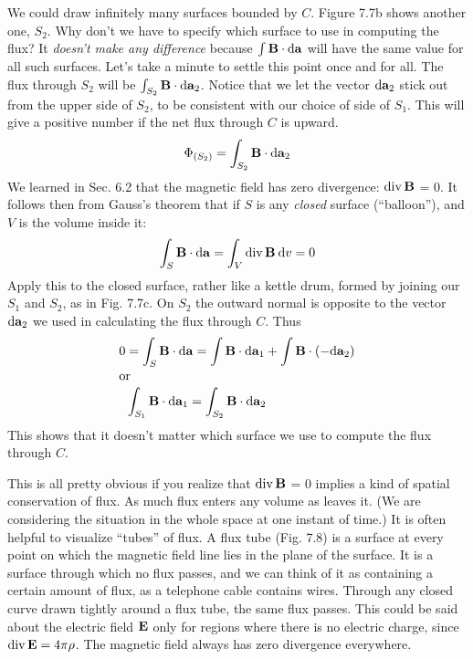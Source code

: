 We could draw infinitely many surfaces bounded by $C$. Figure 7.7b
shows another one, $S_2$. Why don't we have to specify which surface
to use in computing the flux? It \emph{doesn't make any difference} because
$\int\mathbf{B}\cdot\textup{d}\mathbf{a}$ will have the same value for all such surfaces. Let's take a
minute to settle this point once and for all. The flux through $S_2$ will
be $\int_{S_2} \mathbf{B}\cdot\textup{d}\mathbf{a}_2$. Notice that we let the vector $\textup{d}\mathbf{a}_2$ stick out from the
upper side of $S_2$, to be consistent with our choice of side of $S_1$. This
will give a positive number if the net flux through $C$ is upward.
\begin{equation}
  \Phi_{(S_2)} = \int_{S_2} \mathbf{B}\cdot\textup{d}\mathbf{a}_2
\end{equation}
We learned in Sec. 6.2 that the magnetic field has zero divergence:
$\operatorname{div}\mathbf{B}$ = 0. It follows then from Gauss's theorem that if $S$ is any
\emph{closed} surface (``balloon''), and $V$ is the volume inside it:
\begin{equation}
  \int_S \mathbf{B}\cdot\textup{d}\mathbf{a} = \int_V \operatorname{div}\mathbf{B}\:\textup{d} v = 0
\end{equation}
Apply this to the closed surface, rather like a kettle drum, formed by
joining our $S_1$ and $S_2$, as in Fig. 7.7c. On $S_2$ the outward normal is
opposite to the vector $\textup{d}\mathbf{a}_2$ we used in calculating the flux through $C$.
Thus
\begin{align}
\begin{split}
  0 &= \int_S \mathbf{B}\cdot\textup{d}\mathbf{a} = \int \mathbf{B}\cdot\textup{d}\mathbf{a}_1+\int \mathbf{B}\cdot(-\textup{d}\mathbf{a}_2) \\
\intertext{or}
    & \int_{S_1} \mathbf{B}\cdot\textup{d}\mathbf{a}_1 =   \int_{S_2} \mathbf{B}\cdot\textup{d}\mathbf{a}_2
\end{split}
\end{align}
This shows that it doesn't matter which surface we use to compute
the flux through $C$.

This is all pretty obvious if you realize that $\operatorname{div}\mathbf{B}$ = 0 implies a
kind of spatial conservation of flux. As much flux enters any volume
as leaves it. (We are considering the situation in the whole space at
one instant of time.) It is often helpful to visualize ``tubes'' of flux.
A flux tube (Fig. 7.8) is a surface at every point on which the magnetic
field line lies in the plane of the surface. It is a surface through
which no flux passes, and we can think of it as containing a certain
amount of flux, as a telephone cable contains wires. Through any
closed curve drawn tightly around a flux tube, the same flux passes.
This could be said about the electric field $\mathbf{E}$ only for regions where
there is no electric charge, since $\operatorname{div}\mathbf{E} = 4\pi\rho$. The magnetic field
always has zero divergence everywhere.

